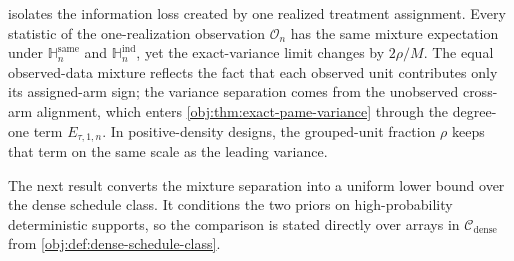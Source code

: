  isolates the information loss created by one realized treatment assignment. Every statistic of the one-realization observation \(\mathcal O_n\) has the same mixture expectation under \(\mathbb H_n^{\mathrm{same}}\) and \(\mathbb H_n^{\mathrm{ind}}\), yet the exact-variance limit changes by \(2\rho/M\). The equal observed-data mixture reflects the fact that each observed unit contributes only its assigned-arm sign; the variance separation comes from the unobserved cross-arm alignment, which enters \cref{obj:thm:exact-pame-variance} through the degree-one term \(E_{\tau,1,n}\). In positive-density designs, the grouped-unit fraction \(\rho\) keeps that term on the same scale as the leading variance.

The next result converts the mixture separation into a uniform lower bound over the dense schedule class. It conditions the two priors on high-probability deterministic supports, so the comparison is stated directly over arrays in \(\mathcal C_{\mathrm{dense}}\) from \cref{obj:def:dense-schedule-class}.

